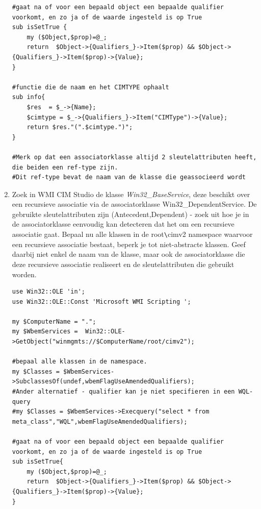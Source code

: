 \documentclass[11pt,a4paper]{report}
\begin{document}
\begin{enumerate}[resume]
\begin{lstlisting}
#gaat na of voor een bepaald object een bepaalde qualifier voorkomt, en zo ja of de waarde ingesteld is op True
sub isSetTrue {
	my ($Object,$prop)=@_;
	return  $Object->{Qualifiers_}->Item($prop) && $Object->{Qualifiers_}->Item($prop)->{Value};
}

#functie die de naam en het CIMTYPE ophaalt
sub info{
	$res  = $_->{Name};
	$cimtype = $_->{Qualifiers_}->Item("CIMType")->{Value};
	return $res."(".$cimtype.")";
}

#Merk op dat een associatorklasse altijd 2 sleutelattributen heeft, die beiden een ref-type zijn.
#Dit ref-type bevat de naam van de klasse die geassocieerd wordt 
	\end{lstlisting}
	\newpage
	\item Zoek in WMI CIM Studio de klasse \textit{Win32\_BaseService}, deze beschikt over een recursieve associatie via de associatorklasse Win32\_DependentService. De gebruikte sleutelattributen zijn (Antecedent,Dependent) - zoek uit hoe je in de associatorklasse eenvoudig kan detecteren dat het om een recursieve associatie gaat. Bepaal nu alle klassen in de root\verb+\+cimv2 namespace waarvoor een recursieve associatie bestaat, beperk je tot niet-abstracte klassen. Geef daarbij niet enkel de naam van de klasse, maar ook de associatorklasse die deze recursieve associatie realiseert en de sleutelattributen die gebruikt worden.
	\begin{lstlisting}
use Win32::OLE 'in';
use Win32::OLE::Const 'Microsoft WMI Scripting ';

my $ComputerName = ".";
my $WbemServices =  Win32::OLE->GetObject("winmgmts://$ComputerName/root/cimv2");

#bepaal alle klassen in de namespace.
my $Classes = $WbemServices->SubclassesOf(undef,wbemFlagUseAmendedQualifiers);
#Ander alternatief - qualifier kan je niet specifieren in een WQL-query
#my $Classes = $WbemServices->Execquery("select * from meta_class","WQL",wbemFlagUseAmendedQualifiers);

#gaat na of voor een bepaald object een bepaalde qualifier voorkomt, en zo ja of de waarde ingesteld is op True
sub isSetTrue{
	my ($Object,$prop)=@_;
	return  $Object->{Qualifiers_}->Item($prop) && $Object->{Qualifiers_}->Item($prop)->{Value};
}


\end{lstlisting}
\end{enumerate}
\end{document}
